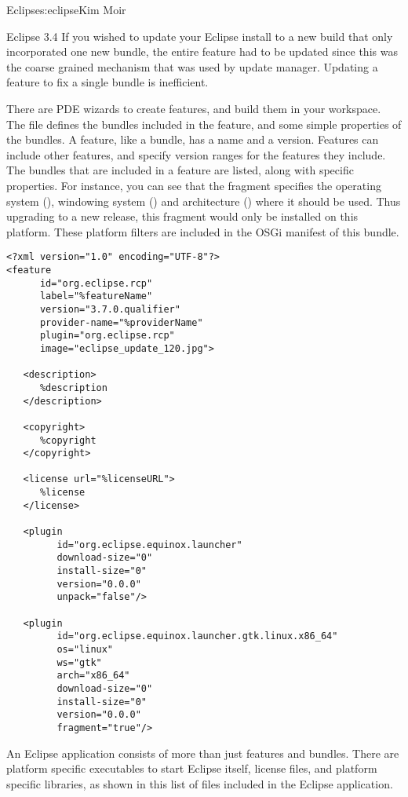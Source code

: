 \begin{aosachapter}{Eclipse}{s:eclipse}{Kim Moir}
\begin{aosasect1}{Eclipse 3.4}
If you wished to update your Eclipse install to a new build that only
incorporated one new bundle, the entire feature had to be updated
since this was the coarse grained mechanism that was used by update
manager.  Updating a feature to fix a single bundle is inefficient.

There are PDE wizards to create features, and build them in your
workspace.  The  file defines the bundles included
in the feature, and some simple properties of the bundles. A feature,
like a bundle, has a name and a version. Features can include other
features, and specify version ranges for the features they
include. The bundles that are included in a feature are listed, along
with specific properties. For instance, you can see that the
 fragment specifies the operating
system (), windowing system () and architecture
() where it should be used. Thus upgrading to a new
release, this fragment would only be installed on this platform. These
platform filters are included in the OSGi manifest of this bundle.

\begin{verbatim}
<?xml version="1.0" encoding="UTF-8"?>
<feature
      id="org.eclipse.rcp"
      label="%featureName"
      version="3.7.0.qualifier"
      provider-name="%providerName"
      plugin="org.eclipse.rcp"
      image="eclipse_update_120.jpg">

   <description>
      %description
   </description>

   <copyright>
      %copyright
   </copyright>

   <license url="%licenseURL">
      %license
   </license>
 
   <plugin
         id="org.eclipse.equinox.launcher"
         download-size="0"
         install-size="0"
         version="0.0.0"
         unpack="false"/>

   <plugin
         id="org.eclipse.equinox.launcher.gtk.linux.x86_64"
         os="linux"
         ws="gtk"
         arch="x86_64"
         download-size="0"
         install-size="0"
         version="0.0.0"
         fragment="true"/>
\end{verbatim}

An Eclipse application consists of more than just features and
bundles.  There are platform specific executables to start Eclipse
itself, license files, and platform specific libraries, as shown in
this list of files included in the Eclipse application.


\end{aosasect1}
\end{aosachapter}
